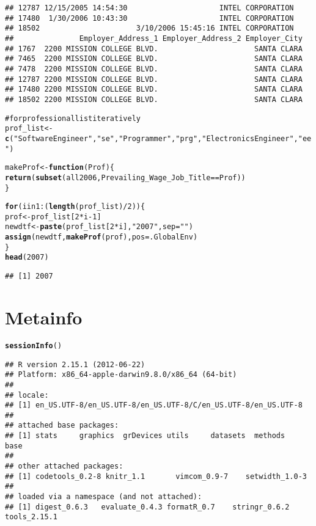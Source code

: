\documentclass{article}\usepackage{graphicx, color}
\makeatletter
\newcommand{\hlfunctioncall}[1]{\textcolor[rgb]{0.501960784313725,0,0.329411764705882}{\textbf{#1}}}%
\newcommand{\hlstring}[1]{\textcolor[rgb]{0.6,0.6,1}{#1}}%
\newcommand{\hlcomment}[1]{\textcolor[rgb]{0.180392156862745,0.6,0.341176470588235}{#1}}%
\newenvironment{kframe}{%
 \def\at@end@of@kframe{}%
 \ifinner\ifhmode%
  \def\at@end@of@kframe{\end{minipage}}%
  \begin{minipage}{\columnwidth}%
 \fi\fi%
 \def\FrameCommand##1{\hskip\@totalleftmargin \hskip-\fboxsep
 \colorbox{shadecolor}{##1}\hskip-\fboxsep
     \hskip-\linewidth \hskip-\@totalleftmargin \hskip\columnwidth}%
 \MakeFramed {\advance\hsize-\width
   \@totalleftmargin\z@ \linewidth\hsize
   \@setminipage}}%
 {\par\unskip\endMakeFramed%
 \at@end@of@kframe}
\newenvironment{knitrout}{}{} %
\makeatother
\begin{document}
\begin{knitrout}
\begin{kframe}
\begin{verbatim}
## 12787 12/15/2005 14:54:30                     INTEL CORPORATION
## 17480  1/30/2006 10:43:30                     INTEL CORPORATION
## 18502                      3/10/2006 15:45:16 INTEL CORPORATION
##               Employer_Address_1 Employer_Address_2 Employer_City
## 1767  2200 MISSION COLLEGE BLVD.                      SANTA CLARA
## 7465  2200 MISSION COLLEGE BLVD.                      SANTA CLARA
## 7478  2200 MISSION COLLEGE BLVD.                      SANTA CLARA
## 12787 2200 MISSION COLLEGE BLVD.                      SANTA CLARA
## 17480 2200 MISSION COLLEGE BLVD.                      SANTA CLARA
## 18502 2200 MISSION COLLEGE BLVD.                      SANTA CLARA
\end{verbatim}
\begin{alltt}

\hlcomment{# for professional list iteratively}
prof_list <- \hlfunctioncall{c}(\hlstring{"Software Engineer"}, \hlstring{"se"}, \hlstring{"Programmer"}, \hlstring{"prg"}, \hlstring{"Electronics Engineer"}, \hlstring{"ee"})

makeProf <- \hlfunctioncall{function}(Prof) \{
    \hlfunctioncall{return}(\hlfunctioncall{subset}(all2006, Prevailing_Wage_Job_Title == Prof))
\}

\hlfunctioncall{for} (i in 1:(\hlfunctioncall{length}(prof_list)/2)) \{
    prof <- prof_list[2 * i - 1]
    newdtf <- \hlfunctioncall{paste}(prof_list[2 * i], \hlstring{"2007"}, sep = \hlstring{""})
    \hlfunctioncall{assign}(newdtf, \hlfunctioncall{makeProf}(prof), pos = .GlobalEnv)
\}
\hlfunctioncall{head}(2007)
\end{alltt}
\begin{verbatim}
## [1] 2007
\end{verbatim}
\end{kframe}
\end{knitrout}







\section{Metainfo}
\begin{knitrout}
\color{fgcolor}\begin{kframe}
\begin{alltt}
\hlfunctioncall{sessionInfo}()
\end{alltt}
\begin{verbatim}
## R version 2.15.1 (2012-06-22)
## Platform: x86_64-apple-darwin9.8.0/x86_64 (64-bit)
## 
## locale:
## [1] en_US.UTF-8/en_US.UTF-8/en_US.UTF-8/C/en_US.UTF-8/en_US.UTF-8
## 
## attached base packages:
## [1] stats     graphics  grDevices utils     datasets  methods   base     
## 
## other attached packages:
## [1] codetools_0.2-8 knitr_1.1       vimcom_0.9-7    setwidth_1.0-3 
## 
## loaded via a namespace (and not attached):
## [1] digest_0.6.3   evaluate_0.4.3 formatR_0.7    stringr_0.6.2  tools_2.15.1
\end{verbatim}
\end{kframe}
\end{knitrout}
\end{document}
